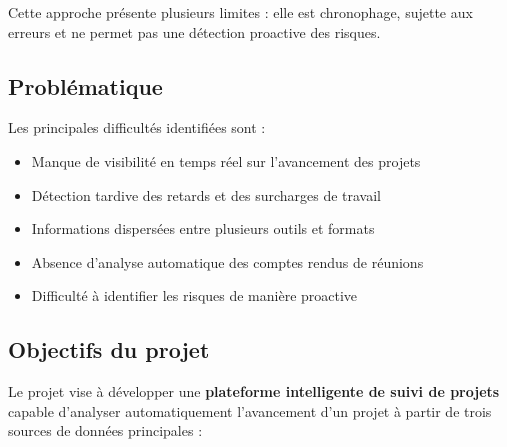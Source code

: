 \documentclass[12pt,a4paper]{article}
\begin{document}
Cette approche pr\'esente plusieurs limites : elle est chronophage, sujette aux erreurs et ne permet pas une d\'etection proactive des risques.

\subsection{Probl\'ematique}
Les principales difficult\'es identifi\'ees sont :
\begin{itemize}[leftmargin=2cm, itemsep=4pt]
    \item[\textcolor{accent}{$\blacktriangleright$}] Manque de visibilit\'e en temps r\'eel sur l'avancement des projets
    \item[\textcolor{accent}{$\blacktriangleright$}] D\'etection tardive des retards et des surcharges de travail
    \item[\textcolor{accent}{$\blacktriangleright$}] Informations dispers\'ees entre plusieurs outils et formats
    \item[\textcolor{accent}{$\blacktriangleright$}] Absence d'analyse automatique des comptes rendus de r\'eunions
    \item[\textcolor{accent}{$\blacktriangleright$}] Difficult\'e \`a identifier les risques de mani\`ere proactive
\end{itemize}

\subsection{Objectifs du projet}
Le projet vise \`a d\'evelopper une \textbf{plateforme intelligente de suivi de projets} capable d'analyser automatiquement l'avancement d'un projet \`a partir de trois sources de donn\'ees principales :

\begin{center}
\end{center}
\end{document}

